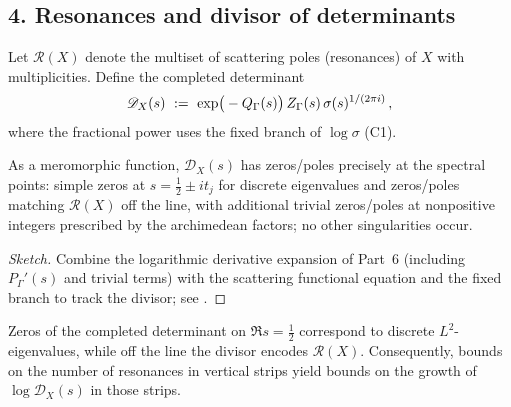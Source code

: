 \subsection*{4. Resonances and divisor of determinants}\relax\hspace{0pt}
\label{subsec:tfc7-res}\relax\hspace{0pt}

Let $\mathcal{R}(X)$ denote the multiset of scattering poles (resonances) of $X$ with multiplicities. \relax\hspace{0pt}
Define the completed determinant
\begin{equation}\relax\hspace{0pt}
\label{eq:tfc7-completed}\relax\hspace{0pt}
\mathscr{D}_X(s)\ :=\ \exp\!\big(-Q_\Gamma(s)\big)\,Z_\Gamma(s)\,\sigma(s)^{1/(2\pi i)}\,,
\end{equation}
where the fractional power uses the fixed branch of $\log\sigma$ (C1). \relax\hspace{0pt}

\begin{theorem}\relax\hspace{0pt}
\label{thm:tfc7-divisor}\relax\hspace{0pt}
As a meromorphic function, $\mathscr{D}_X(s)$ has zeros/poles precisely at the spectral points: simple zeros at $s=\tfrac12\pm it_j$ for discrete eigenvalues and zeros/poles matching $\mathcal{R}(X)$ off the line, with additional trivial zeros/poles at nonpositive integers prescribed by the archimedean factors; no other singularities occur. \relax\hspace{0pt}
\end{theorem}

\begin{proof}[Sketch]\relax\hspace{0pt}
Combine the logarithmic derivative expansion of Part~6 (including $P_\Gamma'(s)$ and trivial terms) with the scattering functional equation and the fixed branch to track the divisor; see \cite{Borthwick,GuillopeZworski}. \relax\hspace{0pt}
\end{proof}

\begin{corollary}\relax\hspace{0pt}
\label{cor:tfc7-det-res}\relax\hspace{0pt}
Zeros of the completed determinant on $\Re s=\tfrac12$ correspond to discrete $L^2$-eigenvalues, while off the line the divisor encodes $\mathcal{R}(X)$. Consequently, bounds on the number of resonances in vertical strips yield bounds on the growth of $\log \mathscr{D}_X(s)$ in those strips. \relax\hspace{0pt}
\end{corollary}


